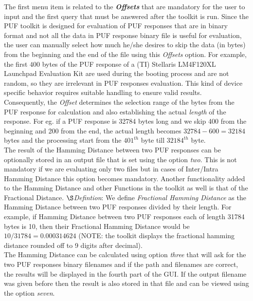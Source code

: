 The first menu item is related to the \emph{\textbf{Offsets}} that are mandatory for the user to input and the first query that must be answered after the toolkit is run. Since the PUF toolkit is designed for evaluation of PUF responses that are in binary format and not all the data in PUF response binary file is useful for evaluation, the user can manually select how much he/she desires to skip the data (in bytes) from the beginning and the end of the file using this \emph{Offsets} option.
For example, the first $400$ bytes of the PUF response of a (TI) Stellaris LM4F120XL Launchpad Evaluation Kit are used during the booting process and are not random, so they are irrelevant in PUF responses evaluation. This kind of device specific behavior requires suitable handling to ensure valid results.\\

Consequently, the \emph{Offset} determines the selection range of the bytes from the PUF response for calculation and also establishing the actual \emph{length} of the response. For eg. if a PUF response is 32784 bytes long and we skip 400 from the beginning and 200 from the end, the actual length becomes $32784-600 = 32184$ bytes and the processing start from the $401^{th}$ byte till $32184^{th}$ byte.\\

The result of the Hamming Distance between two PUF responses can be optionally stored in an output file that is set using the option \emph{two}. This is not mandatory if we are evaluating only two files but in cases of Inter/Intra Hamming Distance this option becomes mandatory. Another functionality added to the Hamming Distance and other Functions in the toolkit as well is that of the Fractional Distance. \newline
$\S$\emph{Defintion}: We define \emph{Fractional Hamming Distance} as the Hamming Distance between two PUF
responses divided by their length. For example, if Hamming Distance between two PUF responses each of length 31784 bytes is 10, then their Fractional Hamming Distance would be $ 10 / 31784 = 0.000314624$ (NOTE: the toolkit displays the fractional hamming distance rounded off to 9 digits after decimal).\\

The Hamming Distance can be calculated using option \emph{three} that will ask for the two PUF responses binary filenames and if the path and filenames are correct, the results will be displayed in the fourth part of the GUI. If the output filename was given before then the result is also stored in that file and can be viewed using the option \emph{seven}.\\

